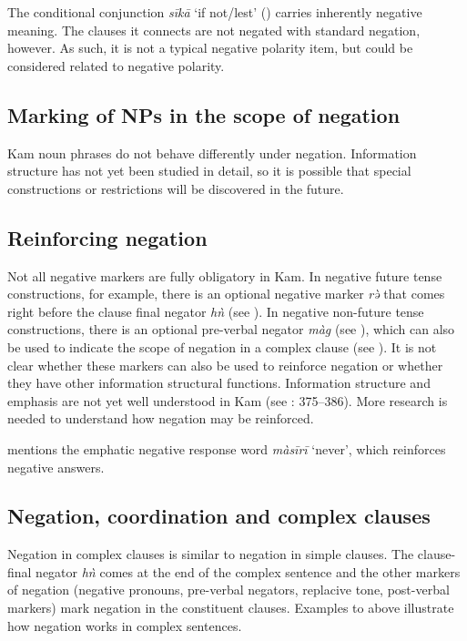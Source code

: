 \documentclass[output=paper,colorlinks,citecolor=brown]{langscibook}
\begin{document}
The conditional conjunction \textit{sīkā} ‘if not/lest’ () carries inherently negative meaning. The clauses it connects are not negated with standard negation, however. As such, it is not a typical negative polarity item, but could be considered related to negative polarity.

\subsection{Marking of NPs in the scope of negation}\label{sec:kam:4.3}

Kam noun phrases do not behave differently under negation. Information structure has not yet been studied in detail, so it is possible that special constructions or restrictions will be discovered in the future.

\subsection{Reinforcing negation}\label{sec:kam:4.4}

Not all negative markers are fully obligatory in Kam. In negative future tense constructions, for example, there is an optional negative marker \textit{rə̀} that comes right before the clause final negator \textit{hǹ} (see ). In negative non-future tense constructions, there is an optional pre-verbal negator \textit{màg} (see ), which can also be used to indicate the scope of negation in a complex clause (see ). It is not clear whether these markers can also be used to reinforce negation or whether they have other information structural functions. Information structure and emphasis are not yet well understood in Kam (see \citealt{Lesage2020}: 375--386). More research is needed to understand how negation may be reinforced.

 mentions the emphatic negative response word \textit{màsīrī} ‘never’, which reinforces negative answers.

\subsection{Negation, coordination and complex clauses}\label{sec:kam:4.5}

Negation in complex clauses is similar to negation in simple clauses. The clause-final negator \textit{hǹ} comes at the end of the complex sentence and the other markers of negation (negative pronouns, pre-verbal negators, replacive tone, post-verbal markers) mark negation in the constituent clauses. Examples  to  above illustrate how negation works in complex sentences.
\end{document}
